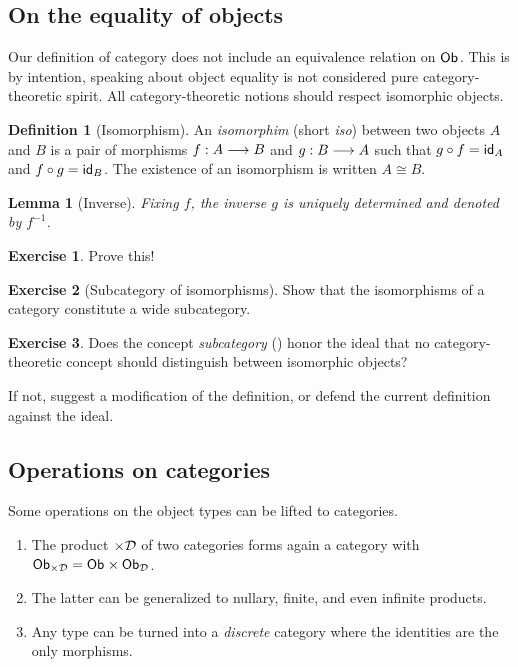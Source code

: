 \documentclass[a4paper,fleqn]{scrartcl}
\newtheorem{lemma}{Lemma}
\theoremstyle{definition}
\newtheorem{definition}{Definition}
\newtheorem{exercise}{Exercise}
\let\C\relax %
\newcommand{\C}{\mathcal{C}}
\begin{document}
\subsection{On the equality of objects}

Our definition of category does not include an equivalence relation on
$\Ob$.  This is by intention, speaking about object equality is not
considered pure category-theoretic spirit.  All category-theoretic
notions should respect isomorphic objects.
\begin{definition}[Isomorphism]
  An \emph{isomorphim} (short \emph{iso}) between two objects $A$ and
  $B$ is a pair of morphisms $f : A \too B$ and $g : B \too A$ such
  that $g \comp f = \id[A]$ and $f \comp g = \id[B]$.
  The existence of an isomorphism is written $A \cong B$.
\end{definition}
\begin{lemma}[Inverse]
  Fixing $f$, the inverse $g$ is uniquely determined and denoted by $f^{-1}$.
\end{lemma}
\begin{exercise}
  Prove this!
\end{exercise}
\begin{exercise}[Subcategory of isomorphisms]
  Show that the isomorphisms of a category constitute a wide subcategory.
\end{exercise}
\begin{exercise}
  Does the concept \emph{subcategory} () honor the
  ideal that no category-theoretic concept should distinguish between
  isomorphic objects?

  If not, suggest a modification of the definition, or defend the
  current definition against the ideal.
\end{exercise}

\subsection{Operations on categories}

Some operations on the object types can be lifted to categories.
\begin{enumerate}
\item The product $\C \times \D$ of two categories forms again a
  category with $\Ob[\C \times \D] = \Ob[\C] \times \Ob[\D]$.
\item The latter can be generalized to nullary, finite, and even
  infinite products.
\item Any type can be turned into a \emph{discrete} category where the
  identities are the only morphisms.
\end{enumerate}
\end{document}
